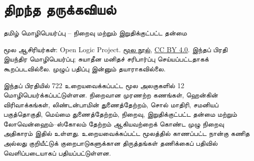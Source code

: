 \documentclass[11pt,a4paper,openany]{memoir}
\begin{document}
\raggedright
\pagestyle{plain}
\chapter*{திறந்த தருக்கவியல்}
\noindent தமிழ் மொழிபெயர்ப்பு -- நிறைவு மற்றும் இறுதிக்குட்பட்ட தன்மை

\noindent மூல ஆசிரியர்கள்: Open Logic Project.
\href{https://github.com/OpenLogicProject/OpenLogic}{மூல நூல்},
\href{https://creativecommons.org/licenses/by/4.0/}{CC BY 4.0}.
இந்தப் பிரதி இயந்திர மொழிபெயர்ப்பு; சுயாதீன மனிதச் சரிபார்ப்பு செய்யப்பட்டதாகக்
கூறப்படவில்லை. முழுப் பதிப்பு இன்னும் தயாராகவில்லை.

\noindent இந்தப் பிரதியில் 722 உறையவைக்கப்பட்ட மூல அலகுகளில் 12
மொழிபெயர்க்கப்பட்டுள்ளன. நிறைவான முரணற்ற கணங்கள், ஹென்கின் விரிவாக்கங்கள்,
லிண்டன்பாமின் துணைத்தேற்றம், சொல் மாதிரி, சமனியப் பகுத்தொகுதி, மெய்மை
துணைத்தேற்றம், நிறைவு, இறுதிக்குட்பட்ட தன்மை மற்றும் லோவென்ஹைம்--ஸ்கோலம்
தேற்றம் ஆகியவற்றைக் கொண்ட முழு நிறைவு அதிகாரம் இதில் உள்ளது. உறையவைக்கப்பட்ட
மூலத்தில் காணப்பட்ட நான்கு கணித அல்லது குறியீட்டுக் குறைபாடுகளுக்கான திருத்தங்கள்
தணிக்கைப் பதிவில் வெளிப்படையாகப் பதியப்பட்டுள்ளன.

\clearpage
\tableofcontents*

\end{document}
